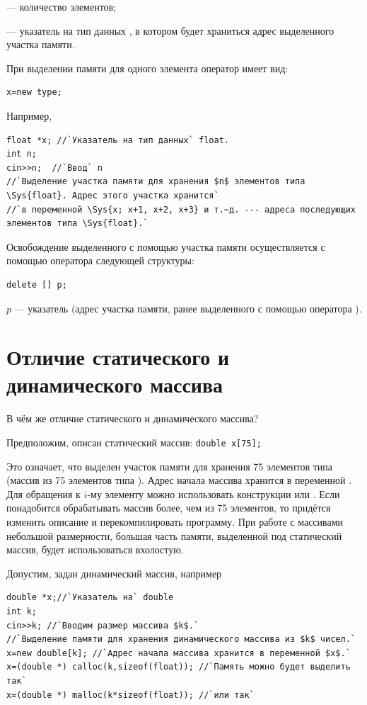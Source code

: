  --- количество элементов;

 --- указатель на тип данных , в котором будет храниться адрес выделенного
участка памяти.

При выделении памяти для одного элемента оператор  имеет вид:
\begin{lstlisting}
x=new type;
\end{lstlisting}
Например,
\begin{lstlisting}
float *x; //`Указатель на тип данных` float.
int n;
cin>>n;  //`Ввод` n 
//`Выделение участка памяти для хранения $n$ элементов типа \Sys{float}. Адрес этого участка хранится`
//`в переменной \Sys{x; x+1, x+2, x+3} и т.~д. --- адреса последующих элементов типа \Sys{float}.`
\end{lstlisting}
Освобождение выделенного с помощью  участка памяти осуществляется  с помощью оператора
 следующей структуры:
\begin{lstlisting}
delete [] p;
\end{lstlisting}
$p$ --- указатель (адрес участка памяти, ранее выделенного с помощью оператора ).

\section[Отличие статического и динамического массива]{Отличие статического и динамического массива}
В чём же отличие статического и динамического массива?

Предположим, описан статический массив:
\lstinline!double x[75];!

Это означает, что выделен участок памяти для хранения 75 элементов типа  (массив из 75 элементов типа
). Адрес начала массива хранится в переменной . Для обращения к
$i$-му элементу можно использовать конструкции  или
. Если понадобится обрабатывать массив более, чем из 75 элементов, то придётся изменить
описание и перекомпилировать программу. При работе с массивами небольшой размерности, большая часть памяти, выделенной
под статический массив, будет использоваться вхолостую.

Допустим, задан динамический массив, например
\begin{lstlisting}
double *x;//`Указатель на` double
int k;
cin>>k; //`Вводим размер массива $k$.`
//`Выделение памяти для хранения динамического массива из $k$ чисел.` 
x=new double[k]; //`Адрес начала массива хранится в переменной $x$.`
x=(double *) calloc(k,sizeof(float)); //`Память можно будет выделить так`
x=(double *) malloc(k*sizeof(float)); //`или так`
\end{lstlisting}


